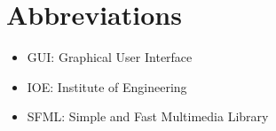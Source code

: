 \documentclass[main.tex]{subfiles}
\begin{document}
	\chapter*{\centering Abbreviations}
	\begin{itemize}
		\item GUI: Graphical User Interface
		\item IOE: Institute of Engineering
		\item SFML: Simple and Fast Multimedia Library
	\end{itemize}
\end{document}

